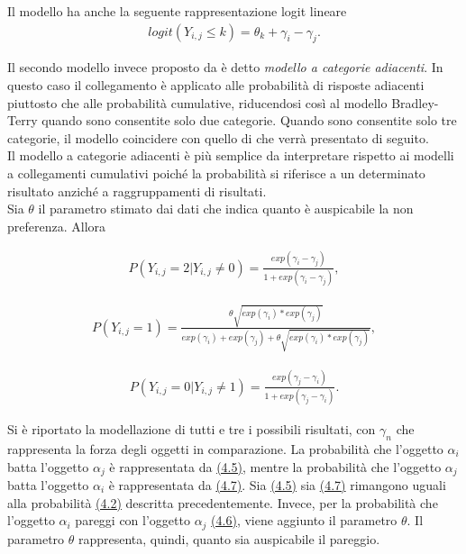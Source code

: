 Il modello ha anche la seguente rappresentazione logit lineare 
\begin{align}
	logit(Y_{i,j}\leq k) =  \theta_{k} + \gamma_i - \gamma_j.
\end{align}

Il secondo modello invece proposto da \textcite{agresti1992analysis} è detto \emph{modello a categorie adiacenti}. In questo caso il collegamento è applicato alle probabilità di risposte adiacenti piuttosto che alle probabilità cumulative, riducendosi così al modello Bradley-Terry quando sono consentite solo due categorie. Quando sono consentite solo tre categorie, il modello coincidere con quello di \textcite{davidson1970extending} che verrà presentato di seguito.\\
Il modello a categorie adiacenti è più semplice da interpretare rispetto ai modelli a collegamenti cumulativi poiché la probabilità si riferisce a un determinato risultato anziché a raggruppamenti di risultati. \\
Sia $\theta$ il parametro stimato dai dati che indica quanto è auspicabile la non preferenza. Allora \autocite{davidson1970extending}

\begin{align}
	P(Y_{i,j} = 2 | Y_{i,j} \not = 0) =  \frac{exp(\gamma_{i} - \gamma_{j})}{1 + exp(\gamma_{i} - \gamma_{j})}, \label{for:4.5}
\end{align}

\begin{align}
	P(Y_{i,j} = 1) =  \frac{\theta \sqrt{exp(\gamma_{i}) * exp(\gamma_{j})}}{exp(\gamma_{i}) + exp(\gamma_{j}) + \theta\sqrt{exp(\gamma_{i}) * exp(\gamma_{j})}}, \label{for:4.6}
\end{align}

\begin{align}	
	P(Y_{i,j} = 0 | Y_{i,j} \not = 1) =  \frac{exp(\gamma_{j} - \gamma_{i})}{1 + exp(\gamma_{j} - \gamma_{i})}\label{for:4.7}.
\end{align}

Si è riportato la modellazione di tutti e tre i possibili risultati, con $\gamma_{n}$ che rappresenta la forza degli oggetti in comparazione. La probabilità che l'oggetto $\alpha_{i}$ batta l'oggetto $\alpha_{j}$ è rappresentata da \hyperref[for:4.5]{(4.5)}, mentre la probabilità che l'oggetto $\alpha_{j}$ batta l'oggetto $\alpha_{i}$ è rappresentata da  \hyperref[for:4.7]{(4.7)}. Sia \hyperref[for:4.5]{(4.5)} sia \hyperref[for:4.7]{(4.7)} rimangono uguali alla probabilità \hyperref[for:3.1]{(4.2)} descritta precedentemente. Invece, per la probabilità che l'oggetto $\alpha_{i}$ pareggi con l'oggetto $\alpha_{j}$ \hyperref[for:4.6]{(4.6)}, viene aggiunto il parametro $\theta$. Il parametro $\theta$ rappresenta, quindi, quanto sia auspicabile il pareggio. \\

